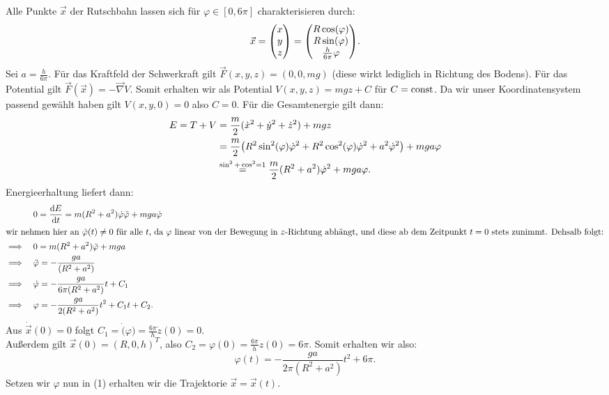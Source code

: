 \documentclass{theozettel}
\renewcommand{\phi}{\varphi}
\begin{document}
	
Alle Punkte $\vec{x}$ der Rutschbahn lassen sich für $\phi \in [0,6\pi]$ charakterisieren durch:
	\begin{equation}
		\vec{x} = \mqty(x \\ y \\ z) = \mqty(R\cos(\phi) \\ R\sin(\phi) \\ \frac{h}{6\pi}\phi).
	\end{equation}
Sei $a=\frac{h}{6\pi}$. Für das Kraftfeld der Schwerkraft gilt $\vec{F}(x,y,z) = (0,0,mg)$ (diese wirkt lediglich in Richtung des Bodens). Für das Potential gilt $\vec{F}(\vec{x}) = -\vec{\nabla}V$. Somit erhalten wir als Potential $V(x,y,z) = mgz + C$ für $C = \operatorname{const}$. Da wir unser Koordinatensystem passend gewählt haben gilt $V(x,y,0) = 0$ also $C=0$. Für die Gesamtenergie gilt dann:
	\begin{align*}
		E = T + V &= \frac{m}{2}(\dot{x}^{2} + \dot{y}^{2} + \dot{z}^{2}) + mgz \\
		&= \frac{m}{2}\qty(R^{2}\sin^{2}(\phi)\dot{\phi}^{2} + R^{2}\cos^{2}(\phi)\dot{\phi}^{2} + a^{2}\dot{\phi}^{2}) + mga\phi \\
		&\stackrel{\sin^{2}+\cos^{2}=1}{=} \frac{m}{2}(R^{2}+a^{2})\dot{\phi}^{2} + mga \phi.
	\end{align*}
Energieerhaltung liefert dann:
	\begin{align*}
		& 0 = \dv{E}{t} = m(R^{2}+a^{2})\dot{\phi}\ddot{\phi} + mga\dot{\phi}\\
	\intertext{wir nehmen hier an $\dot{\phi}(t) \neq 0$ für alle $t$, da $\phi$ linear von der Bewegung in $z$-Richtung abhängt, und diese ab dem Zeitpunkt $t=0$ stets zunimmt. Dehsalb folgt:}
		\implies \ \ \ & 0 = m(R^{2}+a^{2})\ddot{\phi} + mga \\
		\implies \ \ \ & \ddot{\phi} = -\frac{ga}{(R^{2}+a^{2})} \\
		\implies \ \ \ & \dot{\phi} = -\frac{ga}{6\pi(R^{2}+a^{2})}t + C_{1} \\
		\implies \ \ \ & \phi = -\frac{ga}{2(R^{2}+a^{2})}t^{2} + C_{1}t + C_{2}.
	\end{align*}
Aus $\dot{\vec{x}}(0) = 0$ folgt $C_{1} = \dot(\phi) = \frac{6\pi}{h}\dot{z}(0) = 0$.\\ Außerdem gilt $\vec{x}(0) = (R,0,h)^{T}$, also $C_{2} = \phi(0) = \frac{6\pi}{h}z(0) = 6\pi$. Somit erhalten wir also:
	\[
		\phi(t) = -\frac{ga}{2\pi(R^{2}+a^{2})}t^{2} + 6\pi.
	\]
Setzen wir $\phi$ nun in (1) erhalten wir die Trajektorie $\vec{x} = \vec{x}(t)$. 
\end{document}
